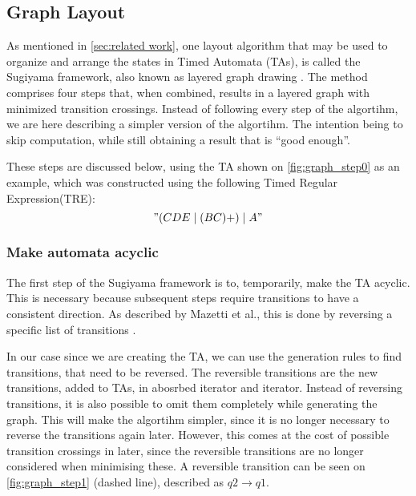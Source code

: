\subsection{Graph Layout}\label{subsec:graphlayout}





As mentioned in \cref{sec:related work}, one layout algorithm that may be used to organize and arrange the states in Timed Automata (TAs), is called the Sugiyama framework, also known as layered graph drawing \cite{Sugiyama1981}. The method comprises four steps that, when combined, results in a layered graph with minimized transition crossings. Instead of following every step of the algortihm, we are here describing a simpler version of the algortihm. The intention being to skip computation, while still obtaining a result that is ``good enough''.

These steps are discussed below, using the TA shown on \cref{fig:graph_step0} as an example, which was constructed using the following Timed Regular Expression(TRE): $$"(CDE\mid(BC)+)\mid A"$$

\begin{center}
    
\end{center}

\subsubsection{Make automata acyclic}
The first step of the Sugiyama framework is to, temporarily, make the TA acyclic. This is necessary because subsequent steps require transitions to have a consistent direction. As described by Mazetti et al., this is done by reversing a specific list of transitions \cite{Mazetti2012}.

In our case since we are creating the TA, we can use the generation rules to find transitions, that need to be reversed.
The reversible transitions are the new transitions, added to TAs, in abosrbed iterator and iterator.
Instead of reversing transitions, it is also possible to omit them completely while generating the graph. This will make the algortihm simpler, since it is no longer necessary to reverse the transitions again later. However, this comes at the cost of possible transition crossings in later, since the reversible transitions are no longer considered when minimising these. A reversible transition can be seen on \cref{fig:graph_step1} (dashed line), described as $q2\rightarrow q1$.

